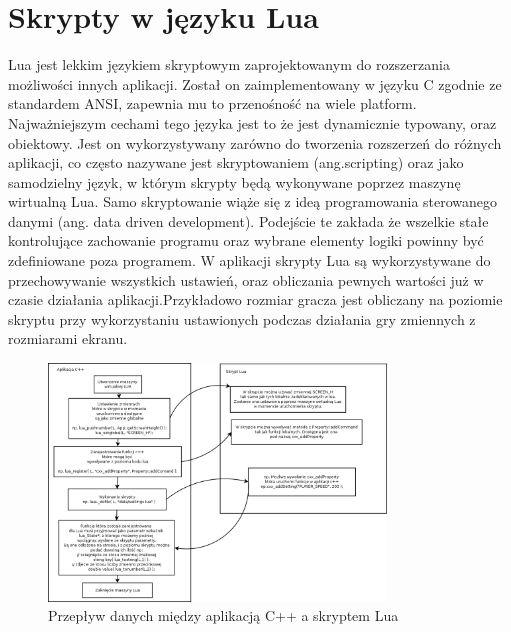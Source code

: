 \section{Skrypty w języku Lua}
\hspace{1cm} Lua jest lekkim językiem skryptowym zaprojektowanym do rozszerzania możliwości innych aplikacji. Został on zaimplementowany w języku C zgodnie ze standardem ANSI, zapewnia mu to przenośność na wiele platform. Najważniejszym cechami tego języka jest to że jest dynamicznie typowany, oraz obiektowy. Jest on wykorzystywany zarówno do tworzenia rozszerzeń do różnych aplikacji, co często nazywane jest skryptowaniem (ang.scripting) oraz jako samodzielny język, w którym skrypty będą wykonywane poprzez maszynę wirtualną Lua. Samo skryptowanie wiąże się z ideą programowania sterowanego danymi (ang. data driven development).
Podejście te zakłada że wszelkie stałe kontrolujące zachowanie programu oraz wybrane elementy logiki powinny być zdefiniowane poza programem. W aplikacji skrypty Lua są wykorzystywane do przechowywanie wszystkich ustawień, oraz obliczania pewnych wartości 
już w czasie działania aplikacji.Przykładowo rozmiar gracza jest obliczany na poziomie skryptu przy wykorzystaniu ustawionych podczas działania gry zmiennych z rozmiarami ekranu. 

\begin{figure}[h]
    \centering
    \includegraphics[width=0.8\textwidth,natwidth=410,natheight=142]{./Pictures/lua_skrypty.png}
    \caption{Przepływ danych między aplikacją C++ a skryptem Lua}
\end{figure}

